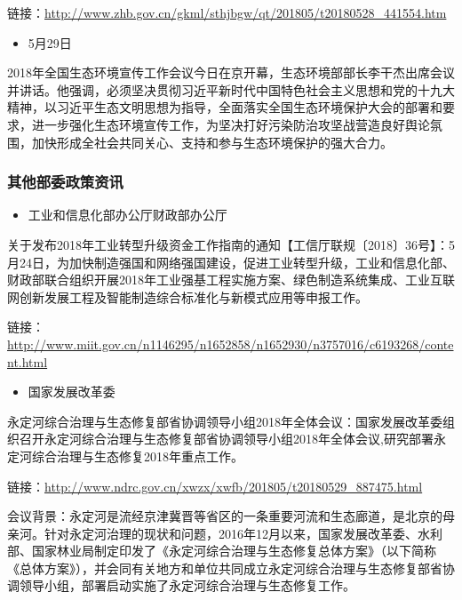 \documentclass[]{book}
\providecommand{\tightlist}{%
  \setlength{\itemsep}{0pt}\setlength{\parskip}{0pt}}
\begin{document}
链接：\url{http://www.zhb.gov.cn/gkml/sthjbgw/qt/201805/t20180528_441554.htm}

\begin{itemize}
\tightlist
\item
  5月29日
\end{itemize}

2018年全国生态环境宣传工作会议今日在京开幕，生态环境部部长李干杰出席会议并讲话。他强调，必须坚决贯彻习近平新时代中国特色社会主义思想和党的十九大精神，以习近平生态文明思想为指导，全面落实全国生态环境保护大会的部署和要求，进一步强化生态环境宣传工作，为坚决打好污染防治攻坚战营造良好舆论氛围，加快形成全社会共同关心、支持和参与生态环境保护的强大合力。

\hypertarget{ux5176ux4ed6ux90e8ux59d4ux653fux7b56ux8d44ux8baf-1}{%
\subsubsection*{其他部委政策资讯}\label{ux5176ux4ed6ux90e8ux59d4ux653fux7b56ux8d44ux8baf-1}}

\begin{itemize}
\tightlist
\item
  工业和信息化部办公厅财政部办公厅
\end{itemize}

关于发布2018年工业转型升级资金工作指南的通知【工信厅联规〔2018〕36号】：5月24日，为加快制造强国和网络强国建设，促进工业转型升级，工业和信息化部、财政部联合组织开展2018年工业强基工程实施方案、绿色制造系统集成、工业互联网创新发展工程及智能制造综合标准化与新模式应用等申报工作。

链接：\url{http://www.miit.gov.cn/n1146295/n1652858/n1652930/n3757016/c6193268/content.html}

\begin{itemize}
\tightlist
\item
  国家发展改革委
\end{itemize}

永定河综合治理与生态修复部省协调领导小组2018年全体会议：国家发展改革委组织召开永定河综合治理与生态修复部省协调领导小组2018年全体会议,研究部署永定河综合治理与生态修复2018年重点工作。

链接：\url{http://www.ndrc.gov.cn/xwzx/xwfb/201805/t20180529_887475.html}

会议背景：永定河是流经京津冀晋等省区的一条重要河流和生态廊道，是北京的母亲河。针对永定河治理的现状和问题，2016年12月以来，国家发展改革委、水利部、国家林业局制定印发了《永定河综合治理与生态修复总体方案》（以下简称《总体方案》），并会同有关地方和单位共同成立永定河综合治理与生态修复部省协调领导小组，部署启动实施了永定河综合治理与生态修复工作。
\end{document}

